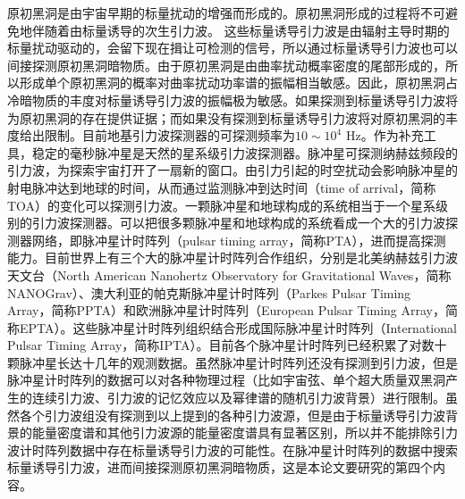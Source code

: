 原初黑洞是由宇宙早期的标量扰动的增强而形成的\cite{Hawking:1971ei,Carr:1974nx}。原初黑洞形成的过程将不可避免地伴随着由标量诱导的次生引力波\cite{Matarrese:1992rp,Matarrese:1993zf,Matarrese:1997ay,Noh:2004bc,Carbone:2004iv,Nakamura:2004rm,Ananda:2006af}。
这些标量诱导引力波是由辐射主导时期的标量扰动驱动的，会留下现在揖让可检测的信号，所以通过标量诱导引力波也可以间接探测原初黑洞暗物质\cite{Saito:2008jc,Bugaev:2010bb,Sasaki:2018dmp,Inomata:2018epa,Baumann:2007zm,Clesse:2018ogk,Nakama:2016enz,Saito:2009jt,Bugaev:2009zh,Assadullahi:2009jc}。由于原初黑洞是由曲率扰动概率密度的尾部形成的，所以形成单个原初黑洞的概率对曲率扰动功率谱的振幅相当敏感\cite{Young:2014ana}。因此，原初黑洞占冷暗物质的丰度对标量诱导引力波的振幅极为敏感。如果探测到标量诱导引力波将为原初黑洞的存在提供证据；而如果没有探测到标量诱导引力波将对原初黑洞的丰度给出限制。目前地基引力波探测器的可探测频率为$10\sim10^4$ Hz\cite{Martynov:2016fzi}。作为补充工具，稳定的毫秒脉冲星是天然的星系级引力波探测器。脉冲星可探测纳赫兹频段的引力波，为探索宇宙打开了一扇新的窗口。由引力引起的时空扰动会影响脉冲星的射电脉冲达到地球的时间，从而通过监测脉冲到达时间（time of arrival，简称TOA）的变化可以探测引力波。一颗脉冲星和地球构成的系统相当于一个星系级别的引力波探测器。可以把很多颗脉冲星和地球构成的系统看成一个大的引力波探测器网络，即脉冲星计时阵列（pulsar timing array，简称PTA）\cite{1978SvA....22...36S,Detweiler:1979wn,1990ApJ...361..300F}，进而提高探测能力。目前世界上有三个大的脉冲星计时阵列合作组织，分别是北美纳赫兹引力波天文台（North American Nanohertz Observatory for Gravitational Waves，简称NANOGrav）\cite{McLaughlin:2013ira}、澳大利亚的帕克斯脉冲星计时阵列（Parkes Pulsar Timing Array，简称PPTA）\cite{Manchester:2012za}和欧洲脉冲星计时阵列（European Pulsar Timing Array，简称EPTA）\cite{Assadullahi:2009jc}。这些脉冲星计时阵列组织结合形成国际脉冲星计时阵列（International Pulsar Timing Array，简称IPTA）\cite{2010CQGra..27h4013H}。目前各个脉冲星计时阵列已经积累了对数十颗脉冲星长达十几年的观测数据。虽然脉冲星计时阵列还没有探测到引力波，但是脉冲星计时阵列的数据可以对各种物理过程（比如宇宙弦\cite{Lentati:2015qwp,Arzoumanian:2018saf,Yonemaru:2020bmr}、单个超大质量双黑洞产生的连续引力波\cite{Zhu:2014rta,Babak:2015lua,Aggarwal:2018mgp}、引力波的记忆效应\cite{Wang:2014zls,Aggarwal:2019ypr}以及幂律谱的随机引力波背景\cite{Lentati:2015qwp,Shannon:2015ect,Arzoumanian:2018saf}）进行限制。虽然各个引力波组没有探测到以上提到的各种引力波源，但是由于标量诱导引力波背景的能量密度谱和其他引力波源的能量密度谱具有显著区别\cite{Yuan:2019wwo}，所以并不能排除引力波计时阵列数据中存在标量诱导引力波的可能性。在脉冲星计时阵列的数据中搜索标量诱导引力波，进而间接探测原初黑洞暗物质，这是本论文要研究的第四个内容。

